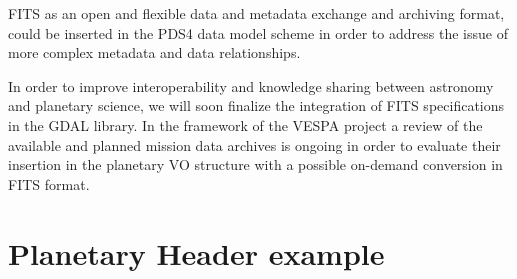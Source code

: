 FITS as an open and flexible data and metadata exchange and archiving format, could be
inserted in the PDS4 data model scheme in order to address the issue of more complex
metadata and data relationships.

In order to improve interoperability and knowledge sharing between astronomy and
planetary science, we will soon finalize the integration of FITS specifications in the
GDAL library.
In the framework of the VESPA project a review of the available and planned mission data
archives is ongoing in order to evaluate their insertion in the planetary VO structure
with a possible on-demand conversion in FITS format.


%
%
%


\appendix
\section{Planetary Header example}

%
%

%

